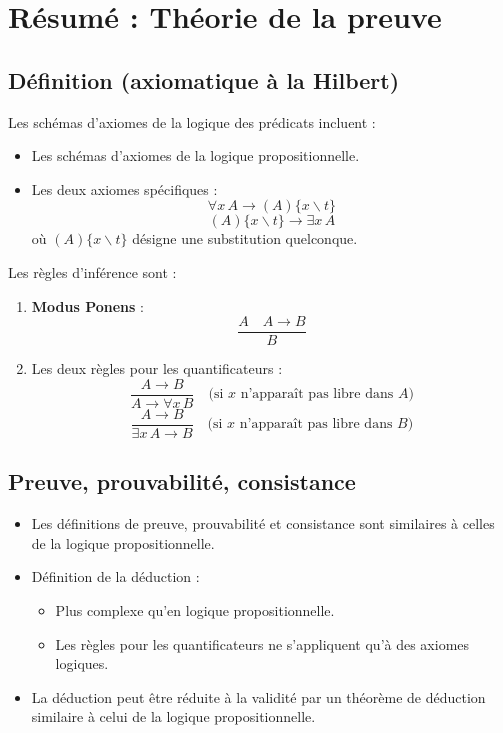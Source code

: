 \documentclass{article}
\begin{document}
\section*{Résumé : Théorie de la preuve}

\subsection*{Définition (axiomatique à la Hilbert)}
Les schémas d'axiomes de la logique des prédicats incluent :
\begin{itemize}
    \item Les schémas d'axiomes de la logique propositionnelle.
    \item Les deux axiomes spécifiques :
    \[
    \forall x \, A \to (A)\{x \backslash t\}
    \]
    \[
    (A)\{x \backslash t\} \to \exists x \, A
    \]
    où $(A)\{x \backslash t\}$ désigne une substitution quelconque.
\end{itemize}
Les règles d'inférence sont :
\begin{enumerate}
    \item \textbf{Modus Ponens} :
    \[
    \frac{A \quad A \to B}{B}
    \]
    \item Les deux règles pour les quantificateurs :
    \[
    \frac{A \to B}{A \to \forall x \, B} \quad \text{(si $x$ n'apparaît pas libre dans $A$)}
    \]
    \[
    \frac{A \to B}{\exists x \, A \to B} \quad \text{(si $x$ n'apparaît pas libre dans $B$)}
    \]
\end{enumerate}

\subsection*{Preuve, prouvabilité, consistance}
\begin{itemize}
    \item Les définitions de preuve, prouvabilité et consistance sont similaires à celles de la logique propositionnelle.
    \item Définition de la déduction :
    \begin{itemize}
        \item Plus complexe qu'en logique propositionnelle.
        \item Les règles pour les quantificateurs ne s'appliquent qu'à des axiomes logiques.
    \end{itemize}
    \item La déduction peut être réduite à la validité par un théorème de déduction similaire à celui de la logique propositionnelle.
\end{itemize}
\end{document}
